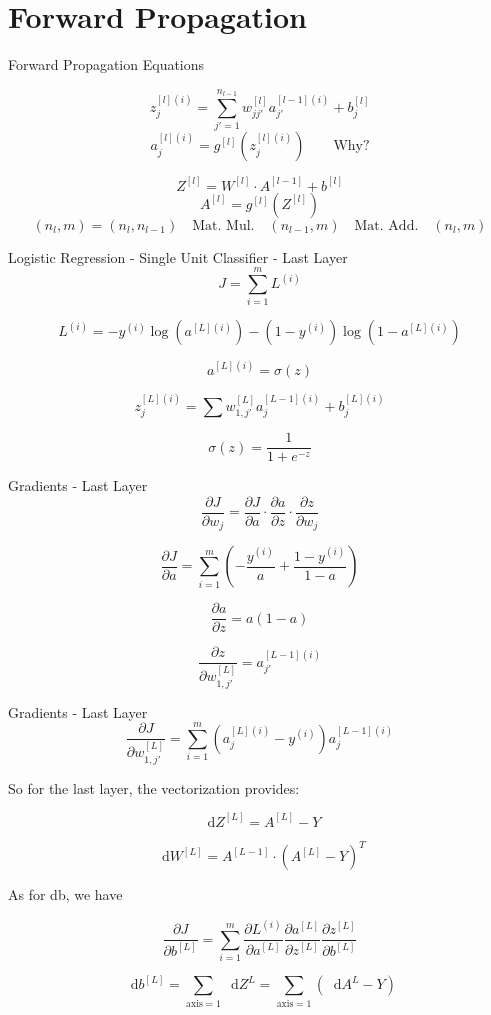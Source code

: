 \documentclass{beamer}
\newcommand{\dd}{\mathop{}\!\text{d}}
\begin{document}
\section{Forward Propagation}
\begin{frame}{Forward Propagation Equations}

\[ z_j^{[l](i)} = \sum_{j'=1}^{n_{l-1}} w_{jj'}^{[l]} a_{j'}^{[l-1](i)} + b_j^{[l]} \]
\[ a_j^{[l](i)} = g^{[l]}(z_j^{[l](i)}) \quad \quad \text{Why?}\]


\[ Z^{[l]} = W^{[l]} \cdot A^{[l-1]} + b^{[l]} \]
\[ A^{[l]} = g^{[l]}(Z^{[l]}) \]
\[ (n_l,m)  = (n_l,n_{l-1}) \quad \text{Mat. Mul.} \quad (n_{l-1},m) \quad \text{Mat. Add.} \quad (n_l,m) \]
\end{frame}


\begin{frame}{Logistic Regression - Single Unit Classifier - Last Layer}
\[
J = \sum_{i=1}^{m} L^{(i)}
\]

\[
L^{(i)} = -y^{(i)} \log(a^{[L](i)}) - (1-y^{(i)}) \log(1-a^{[L](i)})
\]

\[
a^{[L](i)} = \sigma(z)
\]

\[
z_j^{[L](i)} = \sum w_{1,j'}^{[L]} a_j^{[L-1](i)} + b_j^{[L](i)}
\]

\[
\sigma(z) = \frac{1}{1+e^{-z}}
\]

\end{frame}



\begin{frame}{Gradients - Last Layer}
\[
\frac{\partial J}{\partial w_j} = \frac{\partial J}{\partial a} \cdot \frac{\partial a}{\partial z} \cdot \frac{\partial z}{\partial w_j}
\]

\[
\frac{\partial J}{\partial a} = \sum_{i=1}^{m} \left( -\frac{y  ^{(i)}   }{a} + \frac{1-y^{(i)}}{1-a} \right)
\]

\[
\frac{\partial a}{\partial z} = a(1-a)
\]

\[
\frac{\partial z}{\partial w_{1,j'}^{[L]}} = a_{j'}^{[L-1](i)}
\]

\end{frame}



\begin{frame}{Gradients - Last Layer}
\[
\frac{\partial J}{\partial w_{1,j'}^{[L]}} = \sum_{i=1}^{m} \left( a_j^{[L](i)} - y^{(i)} \right) a_j^{[L-1](i)}
\]

So for the last layer, the vectorization provides:

\[
\dd Z^{[L]} = A^{[L]}  -Y
\]

\[
\dd W^{[L]} = A^{[L-1]} \cdot {(A^{[L]}  -Y)}^T
\]


As for db, we have

\[
\frac{\partial J}{\partial b^{[L]}} = \sum_{i=1}^{m} \frac{\partial L^{(i)}}{\partial a^{[L]}}  \frac{\partial a^{[L]}}{\partial z^{[L]}}  \frac{\partial z^{[L]}}{\partial b^{[L]}}
\]

\[
\dd b^{[L]} = \sum_{\text{axis}=1} \dd Z^{L} = \sum_{\text{axis}=1} (\dd A^{L} - Y)
\]
\end{frame}
\end{document}
